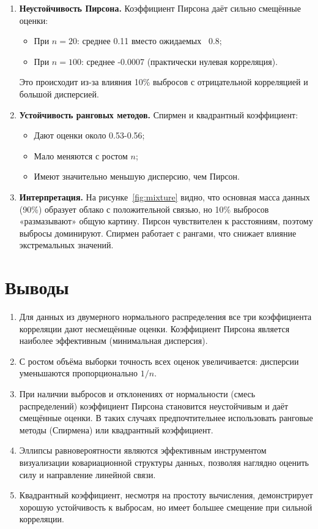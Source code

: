 \documentclass[12pt, a4paper]{article}
\begin{document}
\begin{enumerate}
    \item \textbf{Неустойчивость Пирсона.} Коэффициент Пирсона даёт сильно смещённые оценки:
    \begin{itemize}
        \item При $n=20$: среднее 0.11 вместо ожидаемых ~0.8;
        \item При $n=100$: среднее -0.0007 (практически нулевая корреляция).
    \end{itemize}
    Это происходит из-за влияния 10\% выбросов с отрицательной корреляцией и большой дисперсией.
    
    \item \textbf{Устойчивость ранговых методов.} Спирмен и квадрантный коэффициент:
    \begin{itemize}
        \item Дают оценки около 0.53-0.56;
        \item Мало меняются с ростом $n$;
        \item Имеют значительно меньшую дисперсию, чем Пирсон.
    \end{itemize}
    
    \item \textbf{Интерпретация.} На рисунке~\ref{fig:mixture} видно, что основная масса данных (90\%) образует облако с положительной связью, но 10\% выбросов «размазывают» общую картину. Пирсон чувствителен к расстояниям, поэтому выбросы доминируют. Спирмен работает с рангами, что снижает влияние экстремальных значений.
\end{enumerate}

\section{Выводы}

\begin{enumerate}
    \item Для данных из двумерного нормального распределения все три коэффициента корреляции дают несмещённые оценки. Коэффициент Пирсона является наиболее эффективным (минимальная дисперсия).
    
    \item С ростом объёма выборки точность всех оценок увеличивается: дисперсии уменьшаются пропорционально $1/n$.
    
    \item При наличии выбросов и отклонениях от нормальности (смесь распределений) коэффициент Пирсона становится неустойчивым и даёт смещённые оценки. В таких случаях предпочтительнее использовать ранговые методы (Спирмена) или квадрантный коэффициент.
    
    \item Эллипсы равновероятности являются эффективным инструментом визуализации ковариационной структуры данных, позволяя наглядно оценить силу и направление линейной связи.
    
    \item Квадрантный коэффициент, несмотря на простоту вычисления, демонстрирует хорошую устойчивость к выбросам, но имеет большее смещение при сильной корреляции.
\end{enumerate}
\end{document}

